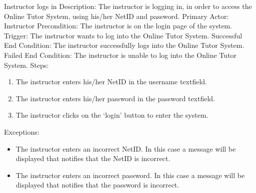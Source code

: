 	
    \begin{section}{Instructor logs in}
		Description: The instructor is logging in, in order to access the Online Tutor System, using his/her NetID and password. \newline
		Primary Actor: Instructor \newline
		Precondition: The instructor is on the login page of the system. \newline
		Trigger: The instructor wants to log into the Online Tutor System. \newline
		Successful End Condition: The instructor successfully logs into the Online Tutor System. \newline
		Failed End Condition: The instructor is unable to log into the Online Tutor System. \newline
        \newline
        Steps:
        \begin{enumerate}
            \item{The instructor enters his/her NetID in the username textfield.}
            \item{The instructor enters his/her password in the password textfield.}
            \item{The instructor clicks on the ‘login’ button to enter the system.}
        \end{enumerate}
        Exceptions:
        \begin{itemize}
            \item{The instructor enters an incorrect NetID. In this case a message will be displayed that notifies that the NetID is incorrect.}
			\item{The instructor enters an incorrect password. In this case a message will be displayed that notifies that the password is incorrect.}
        \end{itemize}
    \end{section}	
	
